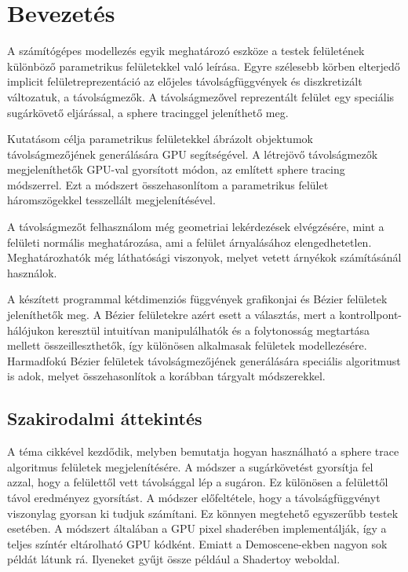 \chapter{Bevezetés}
\label{ch:intro}

A számítógépes modellezés egyik meghatározó eszköze a testek felületének különböző parametrikus felületekkel való leírása. Egyre szélesebb körben elterjedő implicit felületreprezentáció az előjeles távolságfüggvények és diszkretizált változatuk, a távolságmezők. A távolságmezővel reprezentált felület egy speciális sugárkövető eljárással, a sphere tracinggel jeleníthető meg.

Kutatásom célja parametrikus felületekkel ábrázolt objektumok távolságmezőjének generálására GPU segítségével. A létrejövő távolságmezők megjeleníthetők GPU-val gyorsított módon, az említett sphere tracing módszerrel. Ezt a módszert összehasonlítom a parametrikus felület háromszögekkel tesszellált megjelenítésével.

A távolságmezőt felhasználom még geometriai lekérdezések elvégzésére, mint a felületi normális meghatározása, ami a felület árnyalásához elengedhetetlen. Meghatározhatók még láthatósági viszonyok, melyet vetett árnyékok számításánál használok.

A készített programmal kétdimenziós függvények grafikonjai és Bézier felületek jeleníthetők meg. A Bézier felületekre azért esett a választás, mert a kontrollpont-hálójukon keresztül intuitívan manipulálhatók és a folytonosság megtartása mellett összeilleszthetők, így különösen alkalmasak felületek modellezésére. Harmadfokú Bézier felületek távolságmezőjének generálására speciális algoritmust is adok, melyet összehasonlítok a korábban tárgyalt módszerekkel.

\section{Szakirodalmi áttekintés}

A téma \citeauthor{Hart1996} cikkével \cite{Hart1996} kezdődik, melyben bemutatja hogyan használható a sphere trace algoritmus felületek megjelenítésére. A módszer a sugárkövetést gyorsítja fel azzal, hogy a felülettől vett távolsággal lép a sugáron. Ez különösen a felülettől távol eredményez gyorsítást. A módszer előfeltétele, hogy a távolságfüggvényt viszonylag gyorsan ki tudjuk számítani. Ez könnyen megtehető egyszerűbb testek esetében. A módszert általában a GPU pixel shaderében implementálják, így a teljes színtér eltárolható GPU kódként. Emiatt a Demoscene-ekben nagyon sok példát látunk rá. Ilyeneket gyűjt össze például a Shadertoy weboldal.

